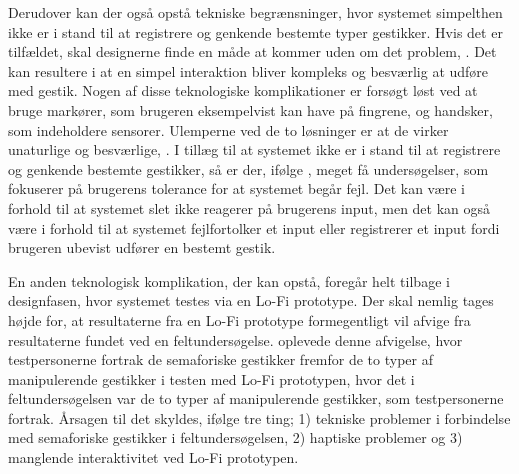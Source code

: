 Derudover kan der også opstå tekniske begrænsninger, hvor systemet simpelthen ikke er i stand til at registrere og genkende bestemte typer gestikker. Hvis det er tilfældet, skal designerne finde en måde at kommer uden om det problem, \parencite[s. 27]{PDF:ATaxonomyOfGestures}. Det kan resultere i at en simpel interaktion bliver kompleks og besværlig at udføre med gestik. Nogen af disse teknologiske komplikationer er forsøgt løst ved at bruge markører, som brugeren eksempelvist kan have på fingrene, og handsker, som indeholdere sensorer. Ulemperne ved de to løsninger er at de virker unaturlige og besværlige, \parencite[s. 26]{PDF:ATaxonomyOfGestures}. I tillæg til at systemet ikke er i stand til at registrere og genkende bestemte gestikker, så er der, ifølge \textcite[s. 37]{PDF:ATaxonomyOfGestures}, meget få undersøgelser, som fokuserer på brugerens tolerance for at systemet begår fejl. Det kan være i forhold til at systemet slet ikke reagerer på brugerens input, men det kan også være i forhold til at systemet fejlfortolker et input eller registrerer et input fordi brugeren ubevist udfører en bestemt gestik.  

En anden teknologisk komplikation, der kan opstå, foregår helt tilbage i designfasen, hvor systemet testes via en Lo-Fi prototype. Der skal nemlig tages højde for, at resultaterne fra en Lo-Fi prototype formegentligt vil afvige fra resultaterne fundet ved en feltundersøgelse. \textcite[s. 176]{PDF:ComparingInputModalities} oplevede denne afvigelse, hvor testpersonerne fortrak de semaforiske gestikker fremfor de to typer af manipulerende gestikker i testen med Lo-Fi prototypen, hvor det i feltundersøgelsen var de to typer af manipulerende gestikker, som testpersonerne fortrak. Årsagen til det skyldes, ifølge \textcite[s. 176]{PDF:ComparingInputModalities} tre ting; 1) tekniske problemer i forbindelse med semaforiske gestikker i feltundersøgelsen, 2) haptiske problemer og 3) manglende interaktivitet ved Lo-Fi prototypen.
%
